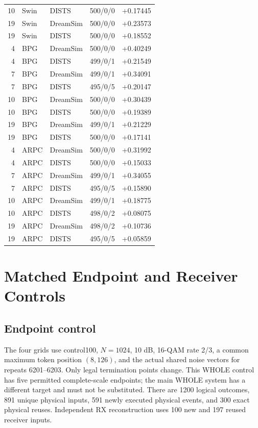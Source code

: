 \documentclass[10pt,letterpaper]{article}
\begin{document}
\begin{longtable}{@{}rlllr@{}}
10 & Swin & DISTS & 500/0/0 & +0.17445\\
19 & Swin & DreamSim & 500/0/0 & +0.23573\\
19 & Swin & DISTS & 500/0/0 & +0.18552\\
4 & BPG & DreamSim & 500/0/0 & +0.40249\\
4 & BPG & DISTS & 499/0/1 & +0.21549\\
7 & BPG & DreamSim & 499/0/1 & +0.34091\\
7 & BPG & DISTS & 495/0/5 & +0.20147\\
10 & BPG & DreamSim & 500/0/0 & +0.30439\\
10 & BPG & DISTS & 500/0/0 & +0.19389\\
19 & BPG & DreamSim & 499/0/1 & +0.21229\\
19 & BPG & DISTS & 500/0/0 & +0.17141\\
4 & ARPC & DreamSim & 500/0/0 & +0.31992\\
4 & ARPC & DISTS & 500/0/0 & +0.15033\\
7 & ARPC & DreamSim & 499/0/1 & +0.34055\\
7 & ARPC & DISTS & 495/0/5 & +0.15890\\
10 & ARPC & DreamSim & 499/0/1 & +0.18775\\
10 & ARPC & DISTS & 498/0/2 & +0.08075\\
19 & ARPC & DreamSim & 498/0/2 & +0.10736\\
19 & ARPC & DISTS & 495/0/5 & +0.05859\\
\bottomrule\end{longtable}

\section{Matched Endpoint and Receiver Controls}\label{sup:3}
\subsection{Endpoint control}
The four grids use control100, $N=1024$, 10 dB, 16-QAM rate 2/3, a common maximum token position $(8,126)$, and the actual shared noise vectors for repeats 6201--6203. Only legal termination points change. This WHOLE control has five permitted complete-scale endpoints; the main WHOLE system has a different target and must not be substituted. There are 1200 logical outcomes, 891 unique physical inputs, 591 newly executed physical events, and 300 exact physical reuses. Independent RX reconstruction uses 100 new and 197 reused receiver inputs.
\end{document}
